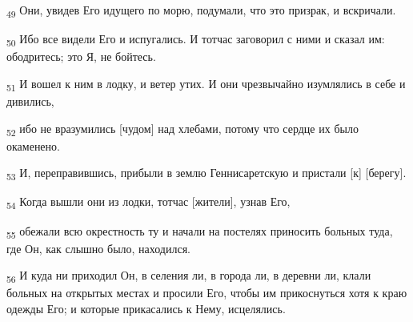 \begin{tcolorbox}
\textsubscript{49} Они, увидев Его идущего по морю, подумали, что это призрак, и вскричали.
\end{tcolorbox}
\begin{tcolorbox}
\textsubscript{50} Ибо все видели Его и испугались. И тотчас заговорил с ними и сказал им: ободритесь; это Я, не бойтесь.
\end{tcolorbox}
\begin{tcolorbox}
\textsubscript{51} И вошел к ним в лодку, и ветер утих. И они чрезвычайно изумлялись в себе и дивились,
\end{tcolorbox}
\begin{tcolorbox}
\textsubscript{52} ибо не вразумились [чудом] над хлебами, потому что сердце их было окаменено.
\end{tcolorbox}
\begin{tcolorbox}
\textsubscript{53} И, переправившись, прибыли в землю Геннисаретскую и пристали [к] [берегу].
\end{tcolorbox}
\begin{tcolorbox}
\textsubscript{54} Когда вышли они из лодки, тотчас [жители], узнав Его,
\end{tcolorbox}
\begin{tcolorbox}
\textsubscript{55} обежали всю окрестность ту и начали на постелях приносить больных туда, где Он, как слышно было, находился.
\end{tcolorbox}
\begin{tcolorbox}
\textsubscript{56} И куда ни приходил Он, в селения ли, в города ли, в деревни ли, клали больных на открытых местах и просили Его, чтобы им прикоснуться хотя к краю одежды Его; и которые прикасались к Нему, исцелялись.
\end{tcolorbox}
